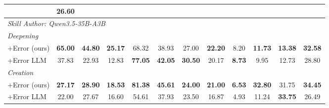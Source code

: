 {\begin{tabular}{@{}l ccccc ccccc c@{}}
    & \textbf{26.60} \\
\midrule
\multicolumn{12}{l}{\textit{Skill Author: Qwen3.5-35B-A3B}} \\[2pt]
\multicolumn{12}{l}{\quad\textit{Deepening}} \\
\quad +Error (ours)
    & \textbf{65.00}          & \textbf{44.80}              & \textbf{25.17}              & 68.32 & 38.93
    & {27.00}      & {\textbf{22.20}} & {8.20}           & {\textbf{11.73}} & {\textbf{13.38}}
    & \textbf{32.58} \\
\quad +Error LLM
    & 37.83                   & 22.93                       & 12.83                       & \textbf{77.05} & \textbf{42.05}
    & {\textbf{30.50}} & {20.17}       & {\textbf{8.73}} & {9.95} & {12.73}
    & 28.80 \\[2pt]
\multicolumn{12}{l}{\quad\textit{Creation}} \\
\quad +Error (ours)
    & \textbf{27.17}          & \textbf{28.90}              & \textbf{18.53}              & \textbf{81.38} & \textbf{45.61}
    & {\textbf{24.00}} & {\textbf{21.00}} & {\textbf{6.53}} & {\textbf{32.80}} & {31.75}
    & \textbf{34.45} \\
\quad +Error LLM
    & 22.00                   & 27.67                       & 16.60                       & 54.61 & 37.93
    & {23.50}      & {16.87}          & {4.93}           & {11.24} & \textbf{33.75}
    & 26.49 \\
\bottomrule
\end{tabular}
}%
